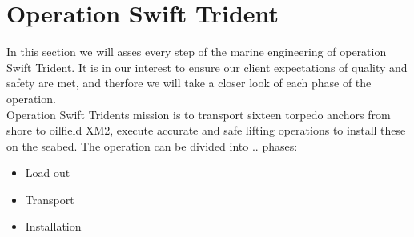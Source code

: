 \documentclass[a4paper,norsk]{article}
\begin{document}
\maketitle
\section*{Operation Swift Trident}
In this section we will asses every step of the marine engineering of operation Swift Trident. It is in our interest to ensure our client expectations of quality and safety are met, and therfore we will take a closer look of each phase of the operation.
\\
Operation Swift Tridents mission is to transport sixteen torpedo anchors from shore to oilfield XM2, execute accurate and safe lifting operations to install these on the seabed. The operation can be divided into .. phases:  
\begin{itemize}
\item Load out
\item Transport
\item Installation 
\end{itemize}
\end{document}
